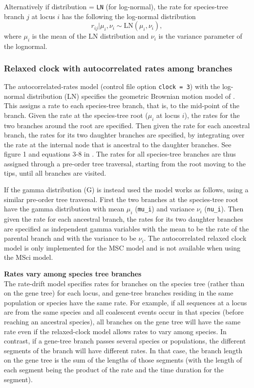 \documentclass{book}
\numberwithin{equation}{section} \renewcommand{\baselinestretch}{0.55}
\begin{document}
Alternatively if distribution = \texttt{LN} (for log-normal), the rate
for species-tree branch $j$ at locus $ i $ has the following the
log-normal distribution
\begin{equation}
  r_{ij} | \mu_i, \nu_i \sim \mathrm{LN}(\mu_i, \nu_i),
\end{equation}
where $\mu_i$ is the mean of the LN distribution and $\nu_i$ is the
variance parameter of the lognormal.

\subsubsection{Relaxed clock with autocorrelated rates among branches}
The autocorrelated-rates model (control file option \texttt{clock =
  3}) with the log-normal distribution (LN) specifies the geometric
Brownian motion model of \citet{Rannala2007}.  This assigns a rate to
each species-tree branch, that is, to the mid-point of the branch.
Given the rate at the species-tree root ($\mu_i$ at locus $i$), the
rates for the two branches around the root are specified.  Then given
the rate for each ancestral branch, the rates for its two daughter
branches are specified, by integrating over the rate at the internal
node that is ancestral to the daughter branches. See figure 1 and
equations 3-8 in \citet{Rannala2007}.  The rates for all species-tree
branches are thus assigned through a pre-order tree traversal,
starting from the root moving to the tips, until all branches are
visited.

If the gamma distribution (G) is instead used the model works as
follows, using a similar pre-order tree traversal.  First the two
branches at the species-tree root have the gamma distribution with
mean $\mu_i$ (\texttt{mu\_i}) and variance $\nu_i$ (\texttt{nu\_i}).
Then given the rate for each ancestral branch, the rates for its two
daughter branches are specified as independent gamma variables with
the mean to be the rate of the parental branch and with the variance
to be $\nu_i$.  The autocorrelated relaxed clock model is only
implemented for the MSC model and is not available when using the MSci
model.

\begin{mdframed}
  \textbf{Rates vary among species tree branches}\\
  The rate-drift model specifies rates for branches on the species
  tree (rather than on the gene tree) for each locus, and gene-tree
  branches residing in the same population or species have the same
  rate.  For example, if all sequences at a locus are from the same
  species and all coalescent events occur in that species (before
  reaching an ancestral species), all branches on the gene tree will
  have the same rate even if the relaxed-clock model allows rates to
  vary among species.  In contrast, if a gene-tree branch passes
  several species or populations, the different segments of the branch
  will have different rates.  In that case, the branch length on the
  gene tree is the sum of the lengths of those segments (with the
  length of each segment being the product of the rate and the time
  duration for the segment).
\end{mdframed}
\end{document}
